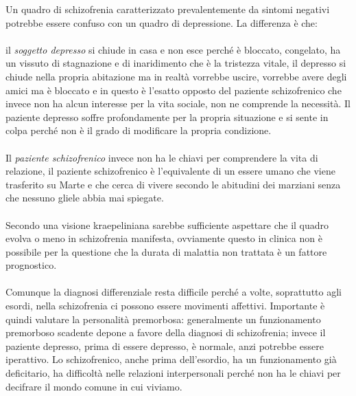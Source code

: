 Un quadro di schizofrenia caratterizzato prevalentemente da sintomi
negativi potrebbe essere confuso con un quadro di depressione. La
differenza è che:
\\\\
il \emph{soggetto depresso} si chiude in casa e non esce perché è
bloccato, congelato, ha un vissuto di stagnazione e di inaridimento che
è la tristezza vitale, il depresso si chiude nella propria abitazione ma
in realtà vorrebbe uscire, vorrebbe avere degli amici ma è bloccato e in
questo è l'esatto opposto del paziente schizofrenico che invece non ha
alcun interesse per la vita sociale, non ne comprende la necessità. Il
paziente depresso soffre profondamente per la propria situazione e si
sente in colpa perché non è il grado di modificare la propria
condizione.
\\\\
Il \emph{paziente schizofrenico} invece non ha le chiavi per comprendere
la vita di relazione, il paziente schizofrenico è l'equivalente di un
essere umano che viene trasferito su Marte e che cerca di vivere secondo
le abitudini dei marziani senza che nessuno gliele abbia mai spiegate.
\\\\
Secondo una visione kraepeliniana sarebbe sufficiente aspettare che il
quadro evolva o meno in schizofrenia manifesta, ovviamente questo in
clinica non è possibile per la questione che la durata di malattia non
trattata è un fattore prognostico.
\\\\
Comunque la diagnosi differenziale resta difficile perché a volte,
soprattutto agli esordi, nella schizofrenia ci possono essere movimenti
affettivi. Importante è quindi valutare la personalità premorbosa:
generalmente un funzionamento premorboso scadente depone a favore della
diagnosi di schizofrenia; invece il paziente depresso, prima di essere
depresso, è normale, anzi potrebbe essere iperattivo. Lo schizofrenico,
anche prima dell'esordio, ha un funzionamento già deficitario, ha
difficoltà nelle relazioni interpersonali perché non ha le chiavi per
decifrare il mondo comune in cui viviamo.

